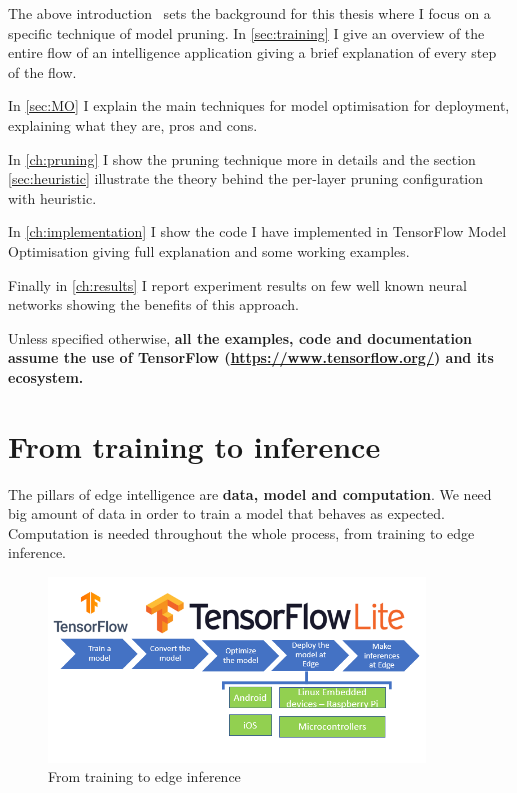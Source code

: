 The above introduction~\cite{xu2020edge} sets the background for this thesis where
I focus on a specific technique of model pruning.
In \autoref{sec:training} I give an overview of the entire flow of an
intelligence application giving a brief explanation of every step of the flow.

In \autoref{sec:MO} I explain the main techniques for model optimisation for
deployment, explaining what they are, pros and cons.

In \autoref{ch:pruning} I show the pruning technique more in details and
the section \autoref{sec:heuristic} illustrate the theory behind the per-layer
pruning configuration with heuristic.

In \autoref{ch:implementation} I show the code I have implemented in
TensorFlow Model Optimisation giving full explanation and some working
examples.

Finally in \autoref{ch:results} I report experiment results on few well known
neural networks showing the benefits of this approach.

Unless specified otherwise, \textbf{all the examples, code and documentation
assume the use of TensorFlow (\url{https://www.tensorflow.org/}) and its
ecosystem.}

\section{From training to inference}\label{sec:training}

The pillars of edge intelligence are \textbf{data, model and computation}.
We need big amount of data in order to train a model that behaves as expected.
Computation is needed throughout the whole process, from training to edge
inference.

\begin{figure}[ht]
    \includegraphics[width=10cm]{images/introduction/training_inference_flow.png}
    \centering
    \caption{From training to edge inference}\label{fig:training_inference}
\end{figure}


